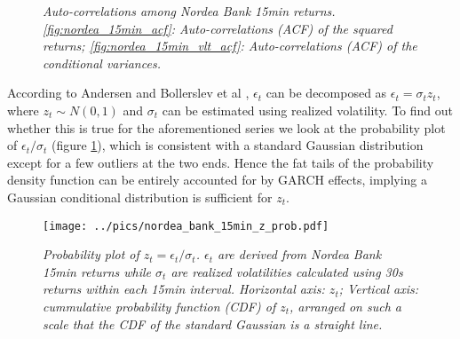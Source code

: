 \begin{figure}[htb!]
  \centering
  \caption{\small \it Auto-correlations among Nordea Bank 15min
    returns. \ref{fig:nordea_15min_acf}: Auto-correlations (ACF) of the
    squared returns; \ref{fig:nordea_15min_vlt_acf}: Auto-correlations
    (ACF) of the conditional variances.}
\end{figure}

According to Andersen and Bollerslev et al \cite{Andersen03},
$\epsilon_t$ can be decomposed as $\epsilon_t = \sigma_t z_t$, where
$z_t \sim N(0, 1)$ and $\sigma_t$ can be estimated using realized
volatility. To find out whether this is true for the aforementioned
series we look at the probability plot of $\epsilon_t/\sigma_t$
(figure \ref{fig:nordea_bank_15min_z_prob}), which is consistent with
a standard Gaussian distribution except for a few outliers at the two
ends. Hence the fat tails of the probability density function can be
entirely accounted for by GARCH effects, implying a Gaussian
conditional distribution is sufficient for $z_t$.
\begin{figure}[htb!]
  \centering
    \texttt{[image: ../pics/nordea\_bank\_15min\_z\_prob.pdf]}
  \caption{\small \it{Probability plot of $z_t = \epsilon_t /
      \sigma_t$. $\epsilon_t$ are derived from Nordea Bank 15min
      returns while $\sigma_t$ are realized volatilities calculated
      using 30s returns within each 15min interval. Horizontal axis:
      $z_t$}; Vertical axis: cummulative probability function (CDF) of
    $z_t$, arranged on such a scale that the CDF of the standard
    Gaussian is a straight line.}
  \label{fig:nordea_bank_15min_z_prob}
\end{figure}

